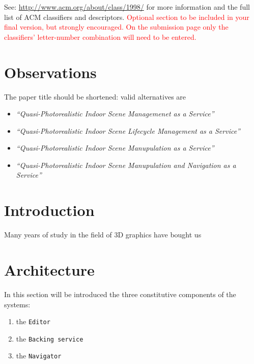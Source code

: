\documentclass{sigchi}
\begin{document}

See: \url{http://www.acm.org/about/class/1998/}
for more information and the full list of ACM classifiers
and descriptors. \newline
\textcolor{red}{Optional section to be included in your final version,
but strongly encouraged. On the submission page only the classifiers’
letter-number combination will need to be entered.}

\section{Observations}
\label{sec:Observations}
The paper title should be shortened: valid alternatives are

\begin{itemize}
  \item \emph{``Quasi-Photorealistic Indoor Scene Managemenet as a Service''}
  \item \emph{``Quasi-Photorealistic Indoor Scene Lifecycle Management as a Service''}
  \item \emph{``Quasi-Photorealistic Indoor Scene Manupulation as a Service''}
  \item \emph{``Quasi-Photorealistic Indoor Scene Manupulation and Navigation as a Service''}
  \end{itemize}



\section{Introduction}  %
\label{sec:introduction}

Many years of study in the field of 3D graphics have bought us 




\section{Architecture} %
\label{sec:architecture}

In this section will be introduced the three constitutive components of the systems:

\begin{enumerate}
  \item the {\tt Editor}
  \item the {\tt Backing service}
  \item the {\tt Navigator}
\end{enumerate}
\end{document}

